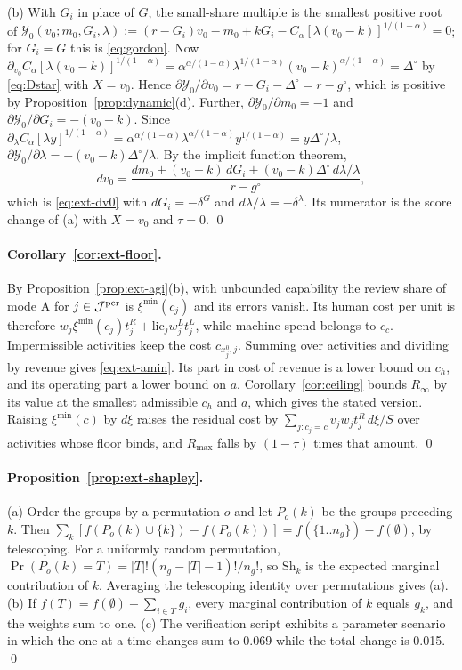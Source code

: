 (b) With $G_i$ in place of $G$, the small-share multiple is the smallest positive root of $\mathcal Y_0(v_0;m_0,G_i,\lambda):=(r-G_i)v_0-m_0+kG_i-C_\alpha[\lambda(v_0-k)]^{1/(1-\alpha)}=0$; for $G_i=G$ this is \eqref{eq:gordon}. Now $\partial_{v_0}C_\alpha[\lambda(v_0-k)]^{1/(1-\alpha)}=\alpha^{\alpha/(1-\alpha)}\lambda^{1/(1-\alpha)}(v_0-k)^{\alpha/(1-\alpha)}=\Delta^\circ$ by \eqref{eq:Dstar} with $X=v_0$. Hence $\partial\mathcal Y_0/\partial v_0=r-G_i-\Delta^\circ=r-g^\circ$, which is positive by Proposition~\ref{prop:dynamic}(d). Further, $\partial\mathcal Y_0/\partial m_0=-1$ and $\partial\mathcal Y_0/\partial G_i=-(v_0-k)$. Since $\partial_\lambda C_\alpha[\lambda y]^{1/(1-\alpha)}=\alpha^{\alpha/(1-\alpha)}\lambda^{\alpha/(1-\alpha)}y^{1/(1-\alpha)}=y\Delta^\circ/\lambda$, $\partial\mathcal Y_0/\partial\lambda=-(v_0-k)\Delta^\circ/\lambda$. By the implicit function theorem,
\[
dv_0=\frac{dm_0+(v_0-k)\,dG_i+(v_0-k)\Delta^\circ\,d\lambda/\lambda}{r-g^\circ},
\]
which is \eqref{eq:ext-dv0} with $dG_i=-\delta^G$ and $d\lambda/\lambda=-\delta^\lambda$. Its numerator is the score change of (a) with $X=v_0$ and $\tau=0$. \qed

\paragraph{Corollary~\ref{cor:ext-floor}.} By Proposition~\ref{prop:ext-agi}(b), with unbounded capability the review share of mode A for $j\in\mathcal J^{\rm per}$ is $\xi^{\min}(c_j)$ and its errors vanish. Its human cost per unit is therefore $w_j\xi^{\min}(c_j)t^R_j+\mathrm{lic}_jw^L_jt^L_j$, while machine spend belongs to $c_c$. Impermissible activities keep the cost $c_{x^0_j,j}$. Summing over activities and dividing by revenue gives \eqref{eq:ext-amin}. Its part in cost of revenue is a lower bound on $c_h$, and its operating part a lower bound on $a$. Corollary~\ref{cor:ceiling} bounds $R_\infty$ by its value at the smallest admissible $c_h$ and $a$, which gives the stated version. Raising $\xi^{\min}(c)$ by $d\xi$ raises the residual cost by $\sum_{j:c_j=c}v_jw_jt^R_j\,d\xi/S$ over activities whose floor binds, and $R_{\max}$ falls by $(1-\tau)$ times that amount. \qed

\paragraph{Proposition~\ref{prop:ext-shapley}.} (a) Order the groups by a permutation $o$ and let $P_o(k)$ be the groups preceding $k$. Then $\sum_k[f(P_o(k)\cup\{k\})-f(P_o(k))]=f(\{1..n_g\})-f(\emptyset)$, by telescoping. For a uniformly random permutation, $\Pr(P_o(k)=T)=|T|!(n_g-|T|-1)!/n_g!$, so $\mathrm{Sh}_k$ is the expected marginal contribution of $k$. Averaging the telescoping identity over permutations gives (a). (b) If $f(T)=f(\emptyset)+\sum_{i\in T}g_i$, every marginal contribution of $k$ equals $g_k$, and the weights sum to one. (c) The verification script exhibits a parameter scenario in which the one-at-a-time changes sum to 0.069 while the total change is 0.015. \qed

